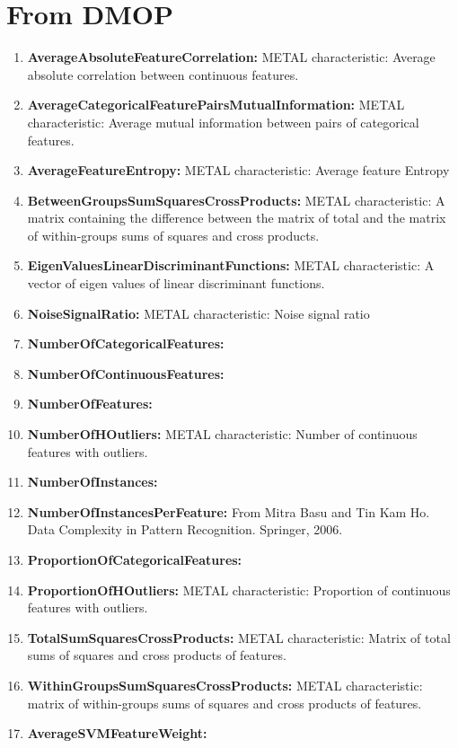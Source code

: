 \documentclass[a4paper,12pt, english]{article}
\begin{document}
\section{From DMOP}
\begin{enumerate}
	\item \textbf{AverageAbsoluteFeatureCorrelation:} METAL characteristic: Average absolute correlation between continuous features.
	\item \textbf{AverageCategoricalFeaturePairsMutualInformation:}  METAL characteristic: Average mutual information between pairs of categorical features. 
	\item \textbf{AverageFeatureEntropy:} METAL characteristic: Average feature Entropy
	\item \textbf{BetweenGroupsSumSquaresCrossProducts:} METAL characteristic: A matrix containing the difference between the matrix of total and the matrix of within-groups sums of squares and cross products.
	\item \textbf{EigenValuesLinearDiscriminantFunctions:} METAL characteristic: A vector of eigen values of linear discriminant functions.
	\item \textbf{NoiseSignalRatio:}  METAL characteristic: Noise signal ratio
	\item \textbf{NumberOfCategoricalFeatures:}
	\item \textbf{NumberOfContinuousFeatures:}
	\item \textbf{NumberOfFeatures:}
	\item \textbf{NumberOfHOutliers:} METAL characteristic: Number of continuous features with outliers.
	\item \textbf{NumberOfInstances:}
	\item \textbf{NumberOfInstancesPerFeature:} From Mitra Basu and Tin Kam Ho. Data Complexity in Pattern Recognition. Springer, 2006. 
	\item \textbf{ProportionOfCategoricalFeatures:}
	\item \textbf{ProportionOfHOutliers:} METAL characteristic: Proportion of continuous features with outliers.
	\item \textbf{TotalSumSquaresCrossProducts:} METAL characteristic: Matrix of total sums of squares and cross products of features.
	\item \textbf{WithinGroupsSumSquaresCrossProducts:} METAL characteristic: matrix of within-groups sums of squares and cross products of features. 
	\item \textbf{AverageSVMFeatureWeight:}
\end{enumerate}  
\end{document}
